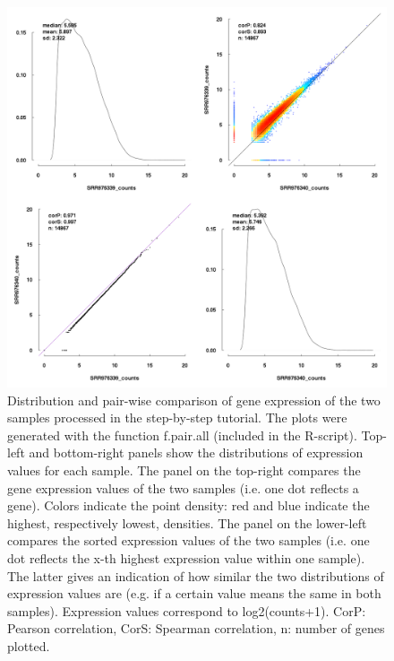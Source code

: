 \documentclass[a4paper,10pt]{article}
\begin{document}
%
\begin{figure}[!ht]
\begin{center}
\centering
\includegraphics[width=5in]{userGuideFigure.png}
\end{center}
\caption{Distribution and pair-wise comparison of gene expression of the two samples processed in the step-by-step tutorial. The plots were generated with the function f.pair.all (included in the R-script). Top-left and bottom-right panels show the distributions of expression values for each sample. The panel on the top-right compares the gene expression values of the two samples (i.e. one dot reflects a gene). Colors indicate the point density: red and blue indicate the highest, respectively lowest, densities. The panel on the lower-left compares the sorted expression values of the two samples (i.e. one dot reflects the x-th highest expression value within one sample). The latter gives an indication of how similar the two distributions of expression values are (e.g. if a certain value means the same in both samples). Expression values correspond to log2(counts+1). CorP: Pearson correlation, CorS: Spearman correlation, n: number of genes plotted.}
\label{allFigure}
\end{figure}
\clearpage
\end{document}
